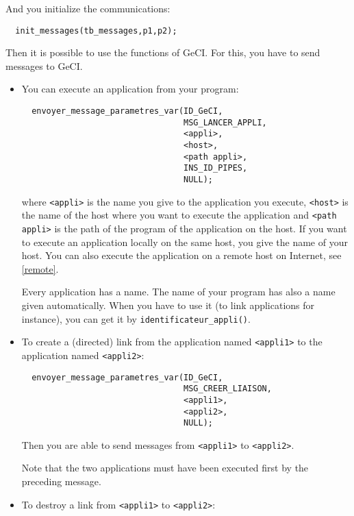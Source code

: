 \documentclass[11pt]{article}
\newcommand{\T}[1]{\texttt{#1}}
\begin{document}
And you initialize the communications:

\begin{verbatim}
  init_messages(tb_messages,p1,p2);
\end{verbatim}

Then it is possible to use the functions of GeCI. For this, you have
to send messages to GeCI.

\begin{itemize}
\item You can execute an application from your program:

\begin{verbatim} 
  envoyer_message_parametres_var(ID_GeCI,
                                 MSG_LANCER_APPLI,
                                 <appli>,
                                 <host>,
                                 <path appli>,
                                 INS_ID_PIPES,
                                 NULL);
\end{verbatim}

where \T{<appli>} is the name you give to the application you execute,
\T{<host>}
is the name of the host where you want to execute the application and 
\T{<path appli>} is the path of the program of the application on the
host. If you want to execute an application locally on the same host,
you give the name of your host. You can also execute the application
on a remote host on Internet, see \ref{remote}.

Every application has a name. The name of your program has also a name
given automatically. When you have to use it (to link applications for
instance), you can get it by \T{identificateur\_appli()}.

\item To create a (directed) link from the application named \T{<appli1>} to
the application named \T{<appli2>}:

\begin{verbatim} 
  envoyer_message_parametres_var(ID_GeCI,
                                 MSG_CREER_LIAISON, 
                                 <appli1>,
                                 <appli2>,
                                 NULL);
\end{verbatim}

Then you are able to send messages from \T{<appli1>} to \T{<appli2>}.

Note that the two applications must have been executed first by the
preceding message.

\item To destroy a link from \T{<appli1>} to \T{<appli2>}:


\end{itemize}
\end{document}
